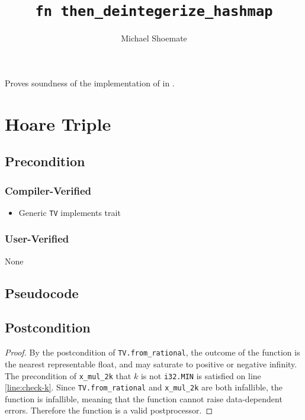 \documentclass{article}
\title{\texttt{fn then\_deintegerize\_hashmap}}
\author{Michael Shoemate}
\date{}
\begin{document}
\maketitle

\contrib
Proves soundness of the implementation of  in .

\section{Hoare Triple}
\subsection*{Precondition}
\subsubsection*{Compiler-Verified}

\begin{itemize}
    \item Generic \texttt{TV} implements trait 
\end{itemize}

\subsubsection*{User-Verified}
None

\subsection*{Pseudocode}


\subsection*{Postcondition}
\begin{theorem}
\end{theorem}

\begin{proof}
    By the postcondition of \texttt{TV.from\_rational},
    the outcome of the function is the nearest representable float,
    and may saturate to positive or negative infinity.
    The precondition of \texttt{x\_mul\_2k} that $k$ is not \texttt{i32.MIN} is satisfied on line \ref{line:check-k}.
    Since \texttt{TV.from\_rational} and \texttt{x\_mul\_2k} are both infallible, 
    the function is infallible,
    meaning that the function cannot raise data-dependent errors.
    Therefore the function is a valid postprocessor.
\end{proof}
\end{document}
